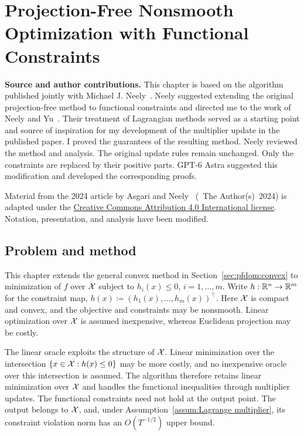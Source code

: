 \chapter{Projection-Free Nonsmooth Optimization with Functional Constraints}
\label{Section:projfree}

\noindent\textbf{Source and author contributions.}
This chapter is based on the algorithm published jointly with
Michael J. Neely~\cite{asgari2024nonsmooth}.
Neely suggested extending the original projection-free method to functional
constraints and directed me to the work of Neely and
Yu~\cite{neely2019lagrangian}. Their treatment of Lagrangian methods served
as a starting point and source of inspiration for my development of the
multiplier update in the published paper. I proved the guarantees of the
resulting method. Neely reviewed the method and analysis.
The original update rules remain unchanged. Only the constraints are
replaced by their positive parts. GPT-6 Astra suggested this modification
and developed the corresponding proofs.

Material from the 2024 article by Asgari and Neely~\cite{asgari2024nonsmooth}
(\textcopyright~The Author(s)~2024) is adapted under the
\href{https://creativecommons.org/licenses/by/4.0/}{Creative Commons
Attribution 4.0 International license}. Notation, presentation, and analysis
have been modified.

\section{Problem and method}

This chapter extends the general convex method in
Section~\ref{sec:pfdom:convex} to minimization of $f$ over $\mathcal{X}$
subject to $h_i(x)\le0$, $i=1,\ldots,m$.
Write $h:\mathbb{R}^n\to\mathbb{R}^m$ for the constraint map,
$h(x)\coloneqq(h_1(x),\ldots,h_m(x))^\top$.
Here $\mathcal{X}$ is compact and convex, and the objective and constraints may be
nonsmooth. Linear optimization over $\mathcal{X}$ is assumed inexpensive, whereas
Euclidean projection may be costly.

The linear oracle exploits the structure of $\mathcal{X}$. Linear minimization
over the intersection $\{x\in\mathcal{X}:h(x)\le0\}$ may be more costly, and no
inexpensive oracle over this intersection is assumed. The algorithm therefore
retains linear minimization over $\mathcal{X}$ and handles the functional
inequalities through multiplier updates. The functional constraints need
not hold at the output point. The output belongs to $\mathcal{X}$, and,
under Assumption~\ref{assum:Lagrange multiplier}, its constraint violation
norm has an $O(T^{-1/2})$ upper bound.

